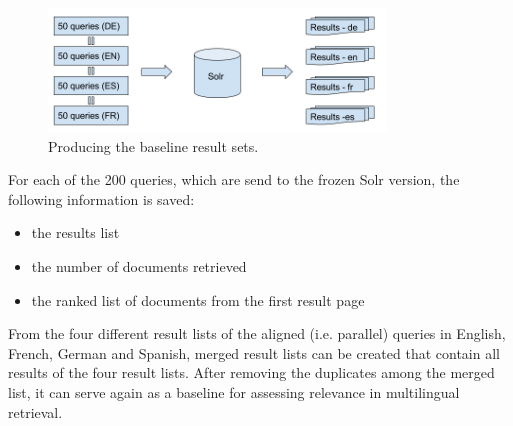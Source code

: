\documentclass[a4paper,11pt]{article}
\begin{document}
\begin{figure}[h]
	\centering
  \includegraphics[width=0.8\textwidth]{./img/queries.png}
	\caption{Producing the baseline result sets.}
	\label{fig3}
\end{figure}

For each of the 200 queries, which are send to the frozen Solr version, the following information is saved:
\begin{itemize}
\item the results list
\item the number of documents retrieved
\item the ranked list of documents from the first result page
\end{itemize}

From the four different result lists of the aligned (i.e. parallel) queries in  English, French, German and Spanish, merged result lists can be created that contain all results of the four result lists. After removing the duplicates among the merged list, it can serve again as a baseline for assessing relevance in multilingual retrieval.

\begin{table}[h]
  \caption{Corpora used for the different experiments.}
 \label{tab:fields}
\end{table}
\end{document}
